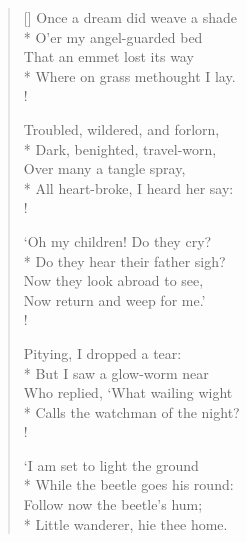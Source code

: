 \documentclass[MAIN]{subfiles}
\begin{document}
\settowidth{\versewidth}{Once a dream did weave a shade}
\begin{verse}[\versewidth]
Once a dream did weave a shade\\*
O'er my angel-guarded bed\\
That an emmet lost its way\\*
Where on grass methought I lay.\\!

Troubled, wildered, and forlorn,\\*
Dark, benighted, travel-worn,\\
Over many a tangle spray,\\*
All heart-broke, I heard her say:\\!

`Oh my children! Do they cry?\\*
Do they hear their father sigh?\\
Now they look abroad to see,\\
Now return and weep for me.'\\!

Pitying, I dropped a tear:\\*
But I saw a glow-worm near\\
Who replied, `What wailing wight\\*
Calls the watchman of the night?\\!

`I am set to light the ground\\*
While the beetle goes his round:\\
Follow now the beetle's hum;\\*
Little wanderer, hie thee home.
\end{verse}
\end{document}
